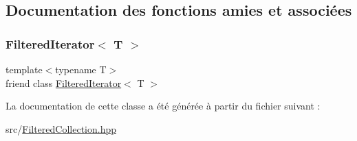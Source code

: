\subsection{Documentation des fonctions amies et associées}
\mbox{\label{class_filtered_collection_ac3e52cfdc762d90ccbb2121ff410fc5e}} 
\subsubsection{\texorpdfstring{Filtered\+Iterator$<$ T $>$}{FilteredIterator< T >}}
{\footnotesize\ttfamily template$<$typename T$>$ \\
friend class \hyperlink{class_filtered_iterator}{Filtered\+Iterator}$<$ T $>$\hspace{0.3cm}{\ttfamily [friend]}}



La documentation de cette classe a été générée à partir du fichier suivant \+:\begin{DoxyCompactItemize}
\item 
src/\hyperlink{_filtered_collection_8hpp}{Filtered\+Collection.\+hpp}\end{DoxyCompactItemize}

